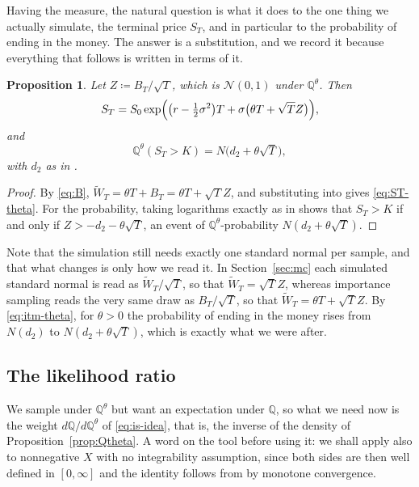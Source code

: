 \documentclass[11pt,a4paper]{article}
\theoremstyle{plain}
\newtheorem{proposition}[theorem]{Proposition}
\theoremstyle{definition}
\theoremstyle{remark}
\newcommand{\Q}{\mathbb{Q}}
\newcommand{\1}{\mathbf{1}}
\newcommand{\eqdef}{\coloneqq}
\newcommand{\Wt}{\widetilde{W}}
\newcommand{\Qt}{\Q^{\theta}}
\begin{document}
Having the measure, the natural question is what it does to the one thing we actually simulate, the terminal price $S_T$, and in particular to the probability of ending in the money. The answer is a substitution, and we record it because everything that follows is written in terms of it.

\begin{proposition}\label{prop:ST-theta}
Let $Z \eqdef B_T/\sqrt T$, which is $\mathcal N(0,1)$ under $\Qt$. Then
\begin{equation}\label{eq:ST-theta}
  S_T = S_0 \exp\Bigl(\bigl(r - \tfrac12\sigma^2\bigr)T + \sigma\bigl(\theta T + \sqrt T Z\bigr)\Bigr),
\end{equation}
and
\begin{equation}\label{eq:itm-theta}
  \Qt(S_T > K) = N\bigl(d_2 + \theta\sqrt T\bigr),
\end{equation}
with $d_2$ as in \cite[(5.27)]{tfg}.
\end{proposition}

\begin{proof}
By \eqref{eq:B}, $\Wt_T = \theta T + B_T = \theta T + \sqrt T Z$, and substituting into \cite[(5.26)]{tfg} gives \eqref{eq:ST-theta}. For the probability, taking logarithms exactly as in \cite[\S 5.3]{tfg} shows that $S_T > K$ if and only if $Z > -d_2 - \theta\sqrt T$, an event of $\Qt$-probability $N(d_2 + \theta\sqrt T)$.
\end{proof}

Note that the simulation still needs exactly one standard normal per sample, and that what changes is only how we read it. In Section~\ref{sec:mc} each simulated standard normal is read as $\Wt_T/\sqrt T$, so that $\Wt_T = \sqrt T Z$, whereas importance sampling reads the very same draw as $B_T/\sqrt T$, so that $\Wt_T = \theta T + \sqrt T Z$. By \eqref{eq:itm-theta}, for $\theta > 0$ the probability of ending in the money rises from $N(d_2)$ to $N(d_2 + \theta\sqrt T)$, which is exactly what we were after.

\subsection{The likelihood ratio}

We sample under $\Qt$ but want an expectation under $\Q$, so what we need now is the weight $d\Q/d\Qt$ of \eqref{eq:is-idea}, that is, the inverse of the density of Proposition~\ref{prop:Qtheta}. A word on the tool before using it: we shall apply \cite[(4.24)]{tfg} also to nonnegative $X$ with no integrability assumption, since both sides are then well defined in $[0, \infty]$ and the identity follows from \cite[(4.23)]{tfg} by monotone convergence.
\end{document}

